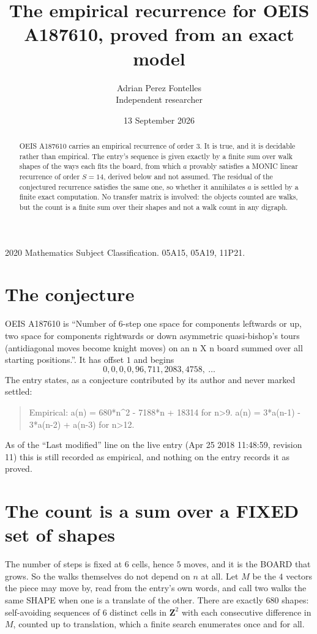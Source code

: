 \documentclass[11pt,a4paper]{article}
\title{The empirical recurrence for OEIS A187610, proved from an exact model}
\author{Adrian Perez Fontelles\\ \small Independent researcher}
\date{13 September 2026}
\theoremstyle{plain}
\theoremstyle{definition}
\begin{document}
\maketitle

\begin{abstract}
OEIS A187610 carries an empirical recurrence of order $3$. It is true, and it is
decidable rather than empirical. The entry's sequence is given exactly by a finite sum over walk shapes of the ways each fits the board, from
which $a$ provably satisfies a MONIC linear recurrence of order $S=14$, derived below and not
assumed. The residual of the conjectured recurrence satisfies the same one, so whether it
annihilates $a$ is settled by a finite exact computation. No transfer matrix is involved: the objects counted are walks, but the count is a finite sum over their shapes and not a walk count in any digraph.
\end{abstract}

\noindent\small 2020 Mathematics Subject Classification. 05A15, 05A19, 11P21.\normalsize

\section{The conjecture}

OEIS A187610 is ``Number of 6-step one space for components leftwards or up, two space for components rightwards or down asymmetric quasi-bishop's tours (antidiagonal moves become knight moves) on an n X n board summed over all starting positions.''. It has offset $1$ and begins
\[
0, 0, 0, 0, 96, 711, 2083, 4758,\ \dots
\]
The entry states, as a conjecture contributed by its author and never marked settled:
\begin{quote}
Empirical: a(n) = 680*n\^{}2 - 7188*n + 18314 for n>9. a(n) = 3*a(n-1) - 3*a(n-2) + a(n-3) for n>12.
\end{quote}
As of the ``Last modified'' line on the live entry (Apr 25 2018 11:48:59, revision 11)
this is still recorded as empirical, and nothing on the entry records it as proved.

\section{The count is a sum over a FIXED set of shapes}

The number of steps is fixed at $6$ cells, hence $5$ moves, and it is the BOARD
that grows. So the walks themselves do not depend on $n$ at all. Let $M$ be the $4$
vectors the piece may move by, read from the entry's own words, and call two walks the same
SHAPE when one is a translate of the other. There are exactly $680$ shapes: self-avoiding
sequences of $6$ distinct cells in $\mathbf{Z}^{2}$ with each consecutive difference in
$M$, counted up to translation, which a finite search enumerates once and for all.
\end{document}
